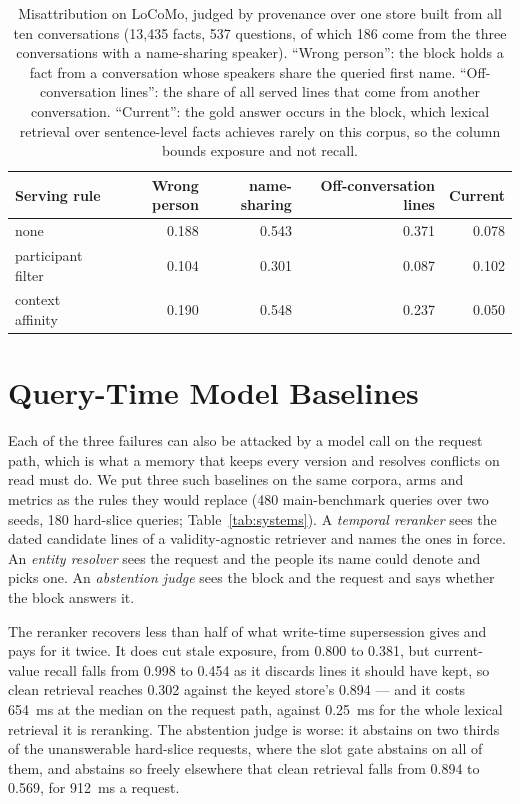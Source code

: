 \documentclass{article} %
\begin{document}
\begin{table}[h]
\centering
\small
\setlength{\tabcolsep}{4pt}
\begin{tabular}{@{}lrrrr@{}}
\toprule
Serving rule & Wrong person & \quad name-sharing & Off-conversation lines & Current \\
\midrule
none & 0.188 & 0.543 & 0.371 & 0.078 \\
participant filter & 0.104 & 0.301 & 0.087 & 0.102 \\
context affinity & 0.190 & 0.548 & 0.237 & 0.050 \\
\bottomrule
\end{tabular}
\caption{Misattribution on LoCoMo, judged by provenance over one store built from all ten conversations (13{,}435 facts, 537 questions, of which 186 come from the three conversations with a name-sharing speaker). ``Wrong person'': the block holds a fact from a conversation whose speakers share the queried first name. ``Off-conversation lines'': the share of all served lines that come from another conversation. ``Current'': the gold answer occurs in the block, which lexical retrieval over sentence-level facts achieves rarely on this corpus, so the column bounds exposure and not recall.}
\label{tab:locomo}
\end{table}
\section{Query-Time Model Baselines}
\label{app:systems}\label{sec:systems}

Each of the three failures can also be attacked by a model call on the request path, which is what a memory that keeps every version and resolves conflicts on read must do. We put three such baselines on the same corpora, arms and metrics as the rules they would replace (480 main-benchmark queries over two seeds, 180 hard-slice queries; Table~\ref{tab:systems}). A \emph{temporal reranker} sees the dated candidate lines of a validity-agnostic retriever and names the ones in force. An \emph{entity resolver} sees the request and the people its name could denote and picks one. An \emph{abstention judge} sees the block and the request and says whether the block answers it.

The reranker recovers less than half of what write-time supersession gives and pays for it twice. It does cut stale exposure, from 0.800 to 0.381, but current-value recall falls from 0.998 to 0.454 as it discards lines it should have kept, so clean retrieval reaches 0.302 against the keyed store's 0.894 --- and it costs 654~ms at the median on the request path, against 0.25~ms for the whole lexical retrieval it is reranking. The abstention judge is worse: it abstains on two thirds of the unanswerable hard-slice requests, where the slot gate abstains on all of them, and abstains so freely elsewhere that clean retrieval falls from 0.894 to 0.569, for 912~ms a request.
\end{document}
